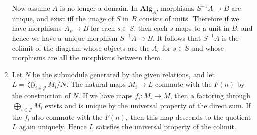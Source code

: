 \documentclass{report}
\newcommand{\cat}[1]{\mathbf{#1}} %
\newcommand{\J}{\mathscr{J}}
\begin{document}
\begin{enumerate}[label=\textbf{1.4.\Alph*.}]
	      Now assume $A$ is no longer a domain. In $\cat{Alg}_A$, morphisms
	      $S^{-1}A\to B$ are unique, and exist iff the image of $S$ in $B$
	      consists of units. Therefore if we have morphisms $A_s\to B$ for
	      each $s\in S$, then each $s$ maps to a unit in $B$, and hence we
	      have a unique morphism $S^{-1}A\to B$. It follows that $S^{-1}A$ is
	      the colimit of the diagram whose objects are the $A_s$ for $s\in S$
	      and whose morphisms are all the morphisms between them.

	\item Let $N$ be the submodule generated by the given relations, and let
	      $L=\bigoplus_{i\in\J}M_i/N$. The natural maps $M_i\to L$
	      commute with the $F(n)$ by the construction of $N$. If we have maps
	      $f_i:M_i\to M$, then a factoring through
	      $\bigoplus_{i\in\J}M_i$ exists and is unique by the
	      universal property of the direct sum. If the $f_i$ also commute with
	      the $F(n)$, then this map descends to the quotient $L$ again
	      uniquely. Hence $L$ satisfies the universal property of the colimit.
\end{enumerate}
\end{document}
